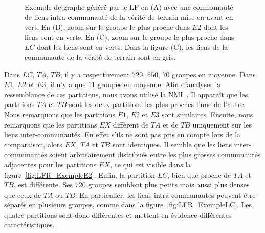 \begin{figure}
	\caption{Exemple de graphe généré par le LF en (A) avec une communauté de liens intra-communauté de la vérité de terrain mise en avant en vert.
	En (B), zoom sur le groupe le plus proche dans $E2$ dont les liens sont en verts.
	En (C), zoom sur le groupe le plus proche dans $LC$ dont les liens sont en verts.
	Dans la figure (C), les liens de la communauté de la vérité de terrain sont en gris. }
	\label{fig:LFR_Exemple}
\end{figure}


Dans $LC$, $TA$, $TB$, il y a respectivement $720$, $650$, $70$ groupes en moyenne.
Dans $E1$, $E2$ et $E3$, il n'y a que $11$ groupes en moyenne.
Afin d'analyser la ressemblance de ces partitions, nous avons utilisé la NMI~\cite{Danon2005}.
Il apparaît que les partitions $TA$ et $TB$ sont les deux partitions les plus proches l'une de l'autre.
Nous remarquons que les partitions $E1$, $E2$ et $E3$ sont similaires.
Ensuite, nous remarquons que les partitions $EX$ diffèrent de $TA$ et de $TB$ uniquement sur les liens inter-communautés.
En effet s'ils ne sont pas pris en compte lors de la comparaison, alors $EX$, $TA$ et $TB$ sont identiques.
Il semble que les liens inter-communautés soient arbitrairement distribués entre les plus grosses communautés adjacentes pour les partitions $EX$, ce qui est visible dans la figure~\ref{fig:LFR_ExempleE2}.
Enfin, la partition $LC$, bien que proche de $TA$ et $TB$, est différente.
Ses $720$ groupes semblent plus petits mais aussi plus denses que ceux de $TA$ ou $TB$.
En particulier, les liens intra-communautés peuvent être séparés en plusieurs groupes, comme dans la figure~\ref{fig:LFR_ExempleLC}.
Les quatre partitions sont donc différentes et mettent en évidence différentes caractéristiques.

